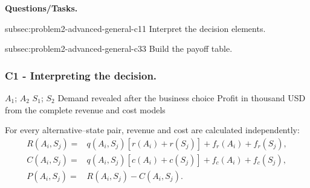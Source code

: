	\textbf{Questions/Tasks.}
	\begin{enumerate}
		\CriterionTask
		{subsec:problem2-advanced-general-c1}{1}
		{Interpret the decision elements.}

		\CriterionTask
		{subsec:problem2-advanced-general-c3}{3}
		{Build the payoff table.}
	\end{enumerate}

	\subsubsection*{C1 - Interpreting the decision.}
	\label{subsec:problem2-advanced-general-c1}

	\DecisionElementsTable
	{\(A_1\); \(A_2\)}
	{\(S_1\); \(S_2\)}
	{Demand revealed after the business choice}
	{Profit in thousand USD from the complete revenue and cost models}

	For every alternative--state pair, revenue and cost are calculated independently:
	\[
	\begin{aligned}
		R(A_i,S_j)
		={}&
		q(A_i,S_j)
		\left[
		r(A_i)+r(S_j)
		\right]
		+
		f_r(A_i)
		+
		f_r(S_j),
		\\
		C(A_i,S_j)
		={}&
		q(A_i,S_j)
		\left[
		c(A_i)+c(S_j)
		\right]
		+
		f_c(A_i)
		+
		f_c(S_j),
		\\
		P(A_i,S_j)
		={}&
		R(A_i,S_j)-C(A_i,S_j).
	\end{aligned}
	\]


